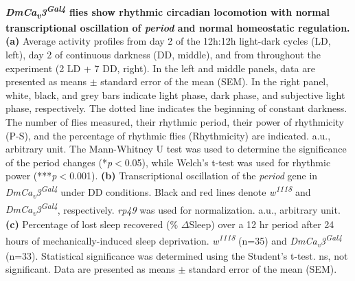 \label{fig:4}
\textbf{ \emph{DmCa\textsubscript{v}3\textsuperscript{Gal4}} flies show rhythmic circadian locomotion with normal transcriptional oscillation of \emph{period} and normal homeostatic regulation.}
\\
\textbf{(a)} Average activity profiles from day 2 of the 12h:12h light-dark cycles (LD, left), day 2 of continuous darkness (DD, middle), and from throughout the experiment (2 LD + 7 DD, right).
In the left and middle panels, data are presented as means $\pm$ standard error of the mean (SEM).
In the right panel, white, black, and grey bars indicate light phase, dark phase, and subjective light phase, respectively.
The dotted line indicates the beginning of constant darkness. 
The number of flies measured, their rhythmic period, their power of rhythmicity (P-S), and the percentage of rhythmic flies (Rhythmicity) are indicated.
a.u., arbitrary unit.
The Mann-Whitney U test was used to determine the significance of the period changes (*\emph{p}$<$0.05), while Welch's t-test was used for rhythmic power (***\emph{p}$<$0.001). 
\textbf{(b)} Transcriptional oscillation of the \emph{period} gene in \emph{DmCa\textsubscript{v}3\textsuperscript{Gal4}} under DD conditions. Black and red lines denote \emph{w\textsuperscript{1118}} and \emph{DmCa\textsubscript{v}3\textsuperscript{Gal4}}, respectively.
\emph{rp49} was used for normalization.
a.u., arbitrary unit.
\textbf{(c)} Percentage of lost sleep recovered (\% $\Delta$Sleep) over a 12 hr period after 24 hours of mechanically-induced sleep deprivation. \emph{w\textsuperscript{1118}} (n=35) and \emph{DmCa\textsubscript{v}3\textsuperscript{Gal4}} (n=33). 
Statistical significance was determined using the Student's t-test. 
ns, not significant.
Data are presented as means $\pm$ standard error of the mean (SEM).
